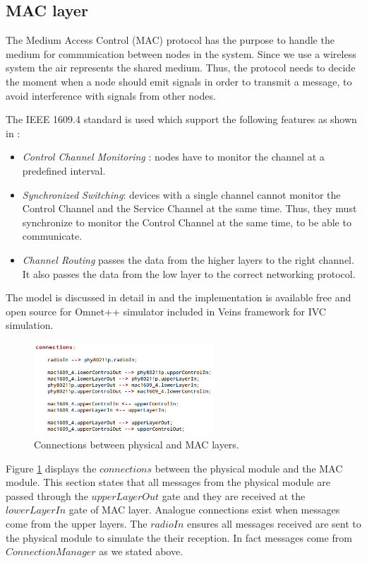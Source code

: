 \subsection{MAC layer}

The Medium Access Control (MAC) protocol has the purpose to handle the medium
for communication between nodes in the system. Since we use a wireless system
the air represents the shared medium. Thus, the protocol needs to decide the
moment when a node should emit signals in order to transmit a message, to avoid
interference with signals from other nodes.

The IEEE 1609.4 standard is used which support the following features as shown
in \cite{phule2012public}:

\begin{itemize}
  \item {\it Control Channel Monitoring} : nodes have to monitor the channel at
  a predefined interval.
  \item {\it Synchronized Switching}: devices with a single channel cannot
  monitor the Control Channel and the Service Channel at the same time. Thus,
  they must synchronize to monitor the Control Channel at the same time, to be
  able to communicate.
  \item {\it Channel Routing} passes the data from the higher layers to the
  right channel. It also passes the data from the low layer to the correct
  networking protocol.
\end{itemize}

The model is discussed in detail in \cite{eckhoff2012multi} and the
implementation is available free and open source for Omnet++ simulator included
in Veins framework for IVC simulation.

\begin{figure}
	\centering
	\includegraphics[width=0.6\textwidth]{img/nic80211p_connections}
	\caption{Connections between physical and MAC layers.}
	\label{fig:nic80211p_connections}
\end{figure}
 
Figure \ref{fig:nic80211p_connections} displays the $connections$ between
the physical module and the MAC module. This section states that all messages
from the physical module are passed through the $upperLayerOut$ gate and they
are received at the $lowerLayerIn$ gate of MAC layer. Analogue connections exist
when messages come from the upper layers. The $radioIn$ ensures all messages
received are sent to the physical module to simulate the their reception. In
fact messages come from $ConnectionManager$ as we stated above.

